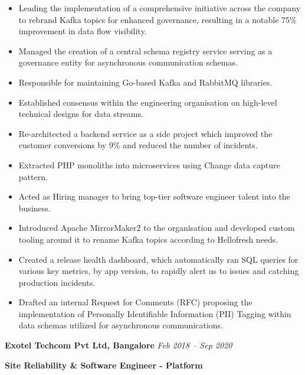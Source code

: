 \documentclass[11pt, oneside]{article}
\begin{document}
\begin{itemize}
  \item Leading the implementation of a comprehensive initiative across the company to rebrand Kafka topics for enhanced governance, resulting in a notable 75\% improvement in data flow visibility.
  \item Managed the creation of a central schema registry service serving as a governance entity for asynchronous communication schemas. 
  \item Responsible for maintaining Go-based Kafka and RabbitMQ libraries. 
  \item Established consensus within the engineering organisation on high-level technical designs for data streams.
  \item Re-architected a backend service as a side project which improved the customer conversions by 9\% and reduced the number of incidents.
  \item Extracted PHP monoliths into microservices using Change data capture pattern.
  \item Acted as Hiring manager to bring top-tier software engineer talent into the business. 
  \item Introduced Apache MirrorMaker2 to the organisation and developed custom tooling around it to rename Kafka topics according to Hellofresh needs.
  \item Created a release health dashboard, which automatically ran SQL queries for various key metrics, by app version, to rapidly alert us to issues and catching production incidents. 
  \item Drafted an internal Request for Comments (RFC) proposing the implementation of Personally Identifiable Information (PII) Tagging within data schemas utilized for asynchronous communications.

\end{itemize}

\medskip

\textbf{Exotel Techcom Pvt Ltd, Bangalore}
\hfill
\textit{Feb 2018 – Sep 2020}

\textbf{Site Reliability \& Software Engineer - Platform}
\end{document}
